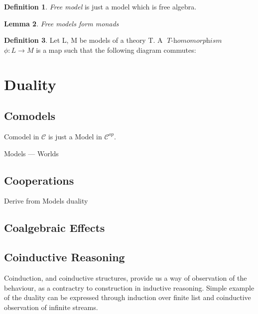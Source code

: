 \documentclass[declaration,shortabstract]{iithesis}
\theoremstyle{definition} \newtheorem{definition}{Definition}[chapter]
\theoremstyle{remark} \newtheorem{remark}[definition]{Observation}
\theoremstyle{plain} \newtheorem{theorem}[definition]{Theorem}
\theoremstyle{plain} \newtheorem{lemma}[definition]{Lemma}
\newcommand{\mathVar}[1]{{\operatorname{\mathit{#1}}}}
\begin{document}
    \begin{definition} \textit{Free model} is just a model which is free algebra.

    \end{definition}


    \begin{lemma}{Free models form monads}

    \end{lemma}

    \begin{definition}

    Let L, M be models of a theory T. A $ \mathVar{T-homomorphism}$
    $\phi : L \rightarrow M$ is a map such that the following diagram commutes:


    \end{definition}

\section{Duality}
    \subsection{Comodels}

    Comodel in $\mathcal{C}$ is just a Model in $ \mathcal{C}^{op} $.

    Models --- Worlds

    \subsection{Cooperations}

    Derive from Models duality

    \subsection{Coalgebraic Effects}

    \subsection{Coinductive Reasoning}

    Coinduction, and coinductive structures, provide us a way of observation
    of the behaviour, as a contractry to construction in inductive reasoning.
    Simple example of the duality can be expressed through induction over finite
    list and coinductive observation of infinite streams.
\end{document}

